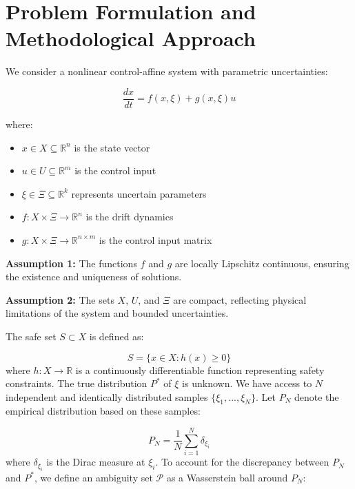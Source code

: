 \documentclass[11pt, oneside]{article}
\begin{document}
\section{Problem Formulation and Methodological Approach}

We consider a nonlinear control-affine system with parametric uncertainties:

\begin{equation}
    \frac{dx}{dt} = f(x,\xi) + g(x,\xi)u
\end{equation}

where:
\begin{itemize}
    \item $x \in X \subseteq \mathbb{R}^n$ is the state vector
    \item $u \in U \subseteq \mathbb{R}^m$ is the control input
    \item $\xi \in \Xi \subseteq \mathbb{R}^k$ represents uncertain parameters
    \item $f : X \times \Xi \to \mathbb{R}^n$ is the drift dynamics
    \item $g : X \times \Xi \to \mathbb{R}^{n\times m}$ is the control input matrix
\end{itemize}

\textbf{Assumption 1:} The functions $f$ and $g$ are locally Lipschitz continuous, ensuring the existence and uniqueness of solutions.

\textbf{Assumption 2:} The sets $X$, $U$, and $\Xi$ are compact, reflecting physical limitations of the system and bounded uncertainties.

The safe set $S \subset X$ is defined as:

\begin{equation}
    S = \{x \in X : h(x) \geq 0\}
\end{equation}
%
where $h : X \to \mathbb{R}$ is a continuously differentiable function representing safety constraints. The true distribution $P^*$ of $\xi$ is unknown. We have access to $N$ independent and identically distributed samples $\{\xi_1, ..., \xi_N\}$. Let $P_N$ denote the empirical distribution based on these samples:

\begin{equation}
    P_N = \frac{1}{N} \sum_{i=1}^N \delta_{\xi_i}
\end{equation}
%
where $\delta_{\xi_i}$ is the Dirac measure at $\xi_i$. To account for the discrepancy between $P_N$ and $P^*$, we define an ambiguity set $\mathcal{P}$ as a Wasserstein ball around $P_N$:
\end{document}
